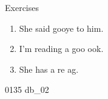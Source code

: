 \documentclass[aspectratio=169,xcolor={dvipsnames,table}]{beamer}
\begin{document}
\begin{frame}[plain]{Exercises }
  \Large
  \begin{enumerate}
    \item<2-> She said gooye to him.
    \item<4-> I'm reading a goo  ook.
    \item<6-> She has a re  ag.
  \end{enumerate}

  \hfill{\tiny 0135}\,{\scriptsize {}\,db\_02}

\end{frame}
\end{document}
